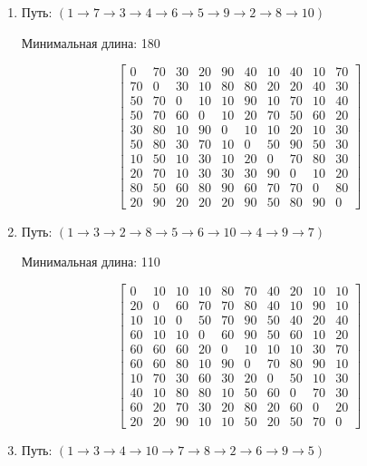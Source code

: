 \documentclass[a4paper,12pt]{article}
\begin{document}
\begin{enumerate}
\item
Путь: $( 1 \rightarrow 7 \rightarrow 3 \rightarrow 4 \rightarrow 6 \rightarrow 5 \rightarrow 9 \rightarrow 2 \rightarrow 8 \rightarrow 10 )$

Минимальная длина: 180

\[
\begin{bmatrix}
0& 70& 30& 20& 90& 40& 10& 40& 10& 70\\
70& 0& 30& 10& 80& 80& 20& 20& 40& 30\\
50& 70& 0& 10& 10& 90& 10& 70& 10& 40\\
50& 70& 60& 0& 10& 20& 70& 50& 60& 20\\
30& 80& 10& 90& 0& 10& 10& 20& 10& 30\\
50& 80& 30& 70& 10& 0& 50& 90& 50& 30\\
10& 50& 10& 30& 10& 20& 0& 70& 80& 30\\
20& 70& 10& 30& 30& 30& 90& 0& 10& 20\\
80& 50& 60& 80& 90& 60& 70& 70& 0& 80\\
20& 90& 20& 20& 20& 90& 50& 80& 90& 0
\end{bmatrix}
\]

\item
Путь: $( 1 \rightarrow 3 \rightarrow 2 \rightarrow 8 \rightarrow 5 \rightarrow 6 \rightarrow 10 \rightarrow 4 \rightarrow 9 \rightarrow 7 )$

Минимальная длина: 110

\[
\begin{bmatrix}
0& 10& 10& 10& 80& 70& 40& 20& 10& 10\\
20& 0& 60& 70& 70& 80& 40& 10& 90& 10\\
10& 10& 0& 50& 70& 90& 50& 40& 20& 40\\
60& 10& 10& 0& 60& 90& 50& 60& 10& 20\\
60& 60& 60& 20& 0& 10& 10& 10& 30& 70\\
60& 60& 80& 10& 90& 0& 70& 80& 90& 10\\
10& 70& 30& 60& 30& 20& 0& 50& 10& 30\\
40& 10& 80& 80& 10& 50& 60& 0& 70& 30\\
60& 20& 70& 30& 20& 80& 20& 60& 0& 20\\
20& 20& 90& 10& 10& 50& 20& 50& 70& 0
\end{bmatrix}
\]

\item
Путь: $( 1 \rightarrow 3 \rightarrow 4 \rightarrow 10 \rightarrow 7 \rightarrow 8 \rightarrow 2 \rightarrow 6 \rightarrow 9 \rightarrow 5 )$


\end{enumerate}
\end{document}
